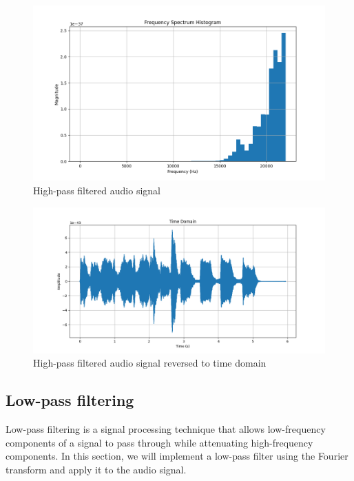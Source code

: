 \documentclass[a4paper,12pt,fleqn]{article}
\begin{document}
\begin{figure}[H]
    \centering
    \includegraphics[width=1\textwidth]{high_pass_filter.png}
    \caption{High-pass filtered audio signal}
    \label{fig:high_pass_filter}
\end{figure}
\begin{figure}[H]
    \centering
    \includegraphics[width=1\textwidth]{high_pass_time_domain.png}
    \caption{High-pass filtered audio signal reversed to time domain}
    \label{fig:high_pass_filter_histogram}

\end{figure}

\subsection{Low-pass filtering}

\hspace{1 em}Low-pass filtering is a signal processing technique that allows low-frequency 
components of a signal to pass through while attenuating high-frequency components. In this 
section, we will implement a low-pass filter using the Fourier transform and apply it to the 
audio signal.
\end{document}
